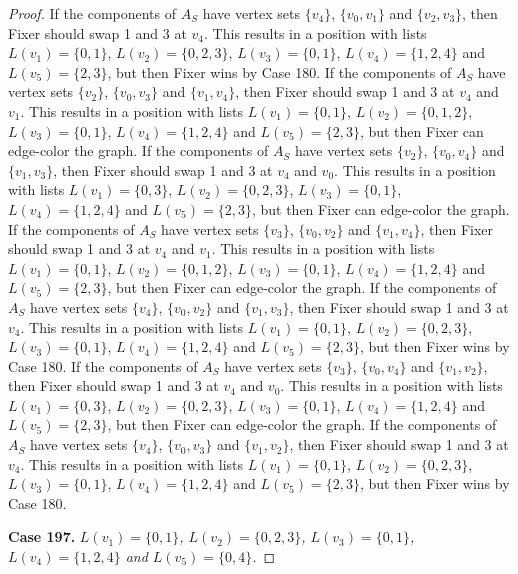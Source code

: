 \documentclass[12pt]{amsart}
\theoremstyle{plain}
\theoremstyle{definition}
\theoremstyle{remark}
\begin{document}
\begin{proof}
If the components of $A_S$ have vertex sets $\{v_4\}$, $\{v_0, v_1\}$ and $\{v_2, v_3\}$, then Fixer should swap 1 and 3 at $v_4$. This results in a position with lists $L(v_1) = \{0, 1\}$, $L(v_2) = \{0, 2, 3\}$, $L(v_3) = \{0, 1\}$, $L(v_4) = \{1, 2, 4\}$ and $L(v_5) = \{2, 3\}$, but then Fixer wins by Case 180.
If the components of $A_S$ have vertex sets $\{v_2\}$, $\{v_0, v_3\}$ and $\{v_1, v_4\}$, then Fixer should swap 1 and 3 at $v_4$ and $v_1$. This results in a position with lists $L(v_1) = \{0, 1\}$, $L(v_2) = \{0, 1, 2\}$, $L(v_3) = \{0, 1\}$, $L(v_4) = \{1, 2, 4\}$ and $L(v_5) = \{2, 3\}$, but then Fixer can edge-color the graph.
If the components of $A_S$ have vertex sets $\{v_2\}$, $\{v_0, v_4\}$ and $\{v_1, v_3\}$, then Fixer should swap 1 and 3 at $v_4$ and $v_0$. This results in a position with lists $L(v_1) = \{0, 3\}$, $L(v_2) = \{0, 2, 3\}$, $L(v_3) = \{0, 1\}$, $L(v_4) = \{1, 2, 4\}$ and $L(v_5) = \{2, 3\}$, but then Fixer can edge-color the graph.
If the components of $A_S$ have vertex sets $\{v_3\}$, $\{v_0, v_2\}$ and $\{v_1, v_4\}$, then Fixer should swap 1 and 3 at $v_4$ and $v_1$. This results in a position with lists $L(v_1) = \{0, 1\}$, $L(v_2) = \{0, 1, 2\}$, $L(v_3) = \{0, 1\}$, $L(v_4) = \{1, 2, 4\}$ and $L(v_5) = \{2, 3\}$, but then Fixer can edge-color the graph.
If the components of $A_S$ have vertex sets $\{v_4\}$, $\{v_0, v_2\}$ and $\{v_1, v_3\}$, then Fixer should swap 1 and 3 at $v_4$. This results in a position with lists $L(v_1) = \{0, 1\}$, $L(v_2) = \{0, 2, 3\}$, $L(v_3) = \{0, 1\}$, $L(v_4) = \{1, 2, 4\}$ and $L(v_5) = \{2, 3\}$, but then Fixer wins by Case 180.
If the components of $A_S$ have vertex sets $\{v_3\}$, $\{v_0, v_4\}$ and $\{v_1, v_2\}$, then Fixer should swap 1 and 3 at $v_4$ and $v_0$. This results in a position with lists $L(v_1) = \{0, 3\}$, $L(v_2) = \{0, 2, 3\}$, $L(v_3) = \{0, 1\}$, $L(v_4) = \{1, 2, 4\}$ and $L(v_5) = \{2, 3\}$, but then Fixer can edge-color the graph.
If the components of $A_S$ have vertex sets $\{v_4\}$, $\{v_0, v_3\}$ and $\{v_1, v_2\}$, then Fixer should swap 1 and 3 at $v_4$. This results in a position with lists $L(v_1) = \{0, 1\}$, $L(v_2) = \{0, 2, 3\}$, $L(v_3) = \{0, 1\}$, $L(v_4) = \{1, 2, 4\}$ and $L(v_5) = \{2, 3\}$, but then Fixer wins by Case 180.

\noindent\textbf{Case 197.  }\textit{$L(v_1) = \{0, 1\}$, $L(v_2) = \{0, 2, 3\}$, $L(v_3) = \{0, 1\}$, $L(v_4) = \{1, 2, 4\}$ and $L(v_5) = \{0, 4\}$.}


\end{proof}
\end{document}
